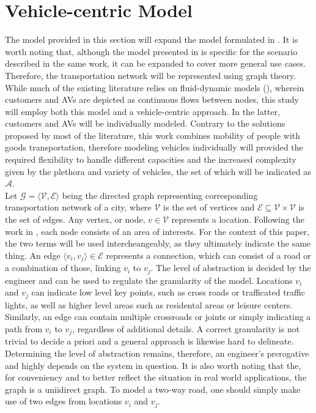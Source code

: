 \section{Vehicle-centric Model}\label{sec:vc_model}
The model provided in this section will expand the model formulated in \cite{project_thesis}. It is worth noting that, although the model presented in \cite{project_thesis} is specific for the scenario described in the same work, it can be expanded to cover more general use cases. \\
Therefore, the transportation network will be represented using graph theory. While much of the existing literature relies on fluid-dynamic models (\cite{amod_review}), wherein customers and AVs are depicted as continuous flows between nodes, this study will employ both this model and a vehicle-centric approach. In the latter, customers and AVs will be individually modeled. Contrary to the solutions proposed by most of the literature, this work combines mobility of people with goods transportation, therefore modeling vehicles individually will provided the required flexibility to handle different capacities and the increased complexity given by the plethora and variety of vehicles, the set of which will be indicated as $\mathcal{A}$.  \\ 
Let $\mathcal{G} = \langle \mathcal{V}, \mathcal{E} \rangle$ being the directed graph representing corresponding transportation network of a city, where $\mathcal{V}$ is the set of vertices and $\mathcal{E} \subseteq \mathcal{V} \times \mathcal{V}$ is the set of edges. Any vertex, or node,  $ v \in  \mathcal{V}$ represents a location. Following the work in \cite{project_thesis}, each node consists of an area of interests. For the context of this paper, the two terms will be used intercheangeably, as they ultimately indicate the same thing. An edge $\langle v_i, v_j \rangle \in \mathcal{E}$ represents a connection, which can consist of a road or a combination of those, linking $v_i$ to $v_j$. The level of abstraction is decided by the engineer and can be used to regulate the granularity of the model. Locations $v_i$ and $v_j$ can indicate low level key points, such as cross roads or trafficated traffic lights, as well as higher level areas such as residental areas or leisure centers. Similarly, an edge can contain multiple crossroads or joints or simply indicating a path from $v_i$ to $v_j$, regardless of additional details. A correct granularity is not trivial to decide a priori and a general approach is likewise hard to delineate.  Determining the level of abstraction remains, therefore, an engineer's prerogative and highly depends on the system in question. It is also worth noting that the, for conveniency and to better reflect the situation in real world applications, the graph is a uniidirect graph. To model a two-way road, one should simply make use of two edges from locations $v_i$ and $v_j$. \\
